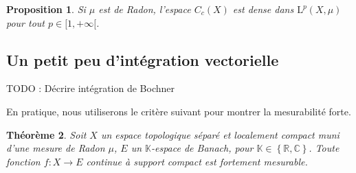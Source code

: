 \documentclass[a4paper,12pt]{article}
\newtheorem{theorem}{Théorème}[section]
\newtheorem{proposition}[theorem]{Proposition}
\newtheorem{lemma}[theorem]{Lemme}
\newcommand{\R}{\mathbb{R}}
\newcommand{\C}{\mathbb{C}}
\newcommand{\K}{\mathbb{K}}
\newcommand{\Bor}{\mathcal{B}}
\newcommand{\set}[1]{\left\{ #1 \right\}}
\newcommand{\TODO}[1]{{\color{red}TODO :} #1}
\begin{document}
\begin{proposition}\label{cont_supp_compact_dense_Lp}
    Si $\mu$ est de Radon, l'espace $C_c(X)$ est dense dans $\mathrm{L}^p(X, \mu)$ pour tout $p\in[1, +\infty[$.
\end{proposition}

%
%     
%
%    

\subsection*{Un petit peu d'intégration vectorielle}

\TODO{Décrire intégration de Bochner}

%

En pratique, nous utiliserons le critère suivant pour montrer la mesurabilité forte.

\begin{theorem}\label{strong_measurable_crit}
    Soit $X$ un espace topologique séparé et localement compact muni d'une mesure de Radon $\mu$,
    $E$ un $\K$-espace de Banach, pour $\K\in\set{\R, \C}$. Toute fonction $f:X\to E$ continue à support compact est
    fortement mesurable.
\end{theorem}
\end{document}
